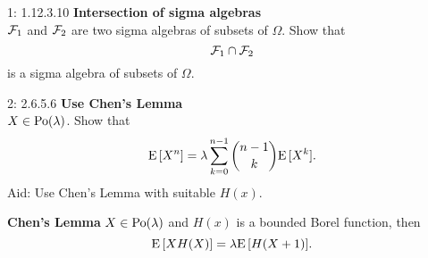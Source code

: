 \documentclass[a4paper,twoside=false,abstract=false,numbers=noenddot,
titlepage=false,headings=small,parskip=half,version=last]{scrartcl}
\begin{document}

\begin{exercise}{1: 1.12.3.10} {\bf Intersection of sigma algebras}   \\
    $\mathcal{F}_1$ and $\mathcal{F}_2$ are two sigma algebras of subsets of $\Omega$. Show
    that
    \begin{equation*}
        \mathcal{F}_1 \cap \mathcal{F}_2
    \end{equation*}
    is a sigma algebra of subsets of $\Omega$.
\end{exercise}
\begin{solution}
\end{solution}
\pagebreak

\begin{exercise}{2: 2.6.5.6} \textbf{Use Chen's Lemma} \\
    $X \in \text{Po}(\lambda)$. Show that
    \begin{equation}
        {\rm E}\,[X^n] =
        \lambda \sum\limits_{k=0}^{n-1} \binom{n-1}{k}{\rm E}\,[X^k].
    \end{equation}
    Aid: Use Chen's Lemma with suitable $H(x)$.
\end{exercise}
\begin{solution}
    \begin{lemma}
        \label{lemma:chen}  %
        \textbf{Chen's Lemma} $X \in \text{Po}(\lambda)$ and $H(x)$ is a bounded
        Borel function, then
        \begin{equation*}
            {\rm E}\,[XH(X)] = \lambda{\rm E}\,[H(X+1)].
        \end{equation*}
    \end{lemma}
\end{solution}
\pagebreak
\end{document}
